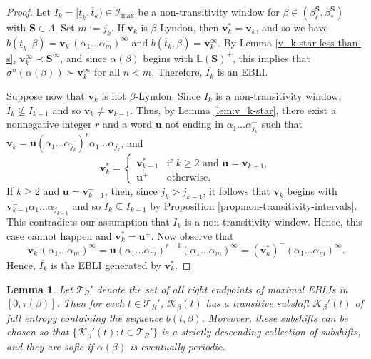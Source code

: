 \documentclass[11pt]{amsart}
\newtheorem{lemma}[theorem]{Lemma}
\theoremstyle{definition}
\theoremstyle{remark}
\numberwithin{equation}{section}
\renewcommand{\L}{\ensuremath{\mathbb{L}}}
\newcommand{\II}{\mathcal{I}}
\newcommand{\Kt}{\widetilde{\mathcal{K}}}
\newcommand{\cs}{ {\mathbf{S}}}
\renewcommand{\u}{\mathbf{u}}
\renewcommand{\v}{\mathbf{v}}
\newcommand{\f}{\infty}
\newcommand{\al}{\alpha}
\newcommand{\si}{\sigma}
\newcommand{\La}{\Lambda}
\begin{document}
\begin{proof}
Let $I_k=[\underline{t}_k,\overline{t}_k)\in\II_{\max}$ be a non-transitivity window for $\beta\in(\beta_\ell^\cs,\beta_*^\cs)$ with $\cs\in\La$. Set $m:=j_k$. If $\v_k$ is $\beta$-Lyndon, then $\v_k^*=\v_k$, and so we have $b(\underline{t}_k,\beta)=\v_k^-(\al_1\dots\al_m^-)^\f$ and $b(\overline{t}_k,\beta)=\v_k^\f$. By Lemma \ref{v_k-star-less-than-s}, $\v_k^\f\prec \cs^\f$, and since $\al(\beta)$ begins with $\L(\cs)^+$, this implies that $\si^n(\al(\beta))\succ \v_k^\f$ for all $n<m$. Therefore, $\overline{I_k}$ is an EBLI.

Suppose now that $\v_k$ is not $\beta$-Lyndon. Since $I_k$ is a non-transitivity window, $I_k\not\subseteq I_{k-1}$ and so $\v_k\neq \v_{k-1}$. Thus, by Lemma \ref{lem:v_k-star}, there exist a nonnegative integer $r$ and a word $\u$ not ending in $\al_1\dots\al_{j_k}^-$ such that $\v_k=\u(\al_1\dots\al_{j_k}^-)^r\al_1\dots\al_{j_k}$, and
\begin{equation*}
\v_k^*=\begin{cases}
\v_{k-1}^* & \mbox{if $k\geq 2$ and $\u=\v_{k-1}^-$},\\
\u^+ & \mbox{otherwise}.
\end{cases}
\end{equation*}
If $k\geq 2$ and $\u=\v_{k-1}^-$, then, since $j_k>j_{k-1}$, it follows that $\v_k$ begins with $\v_{k-1}^-\al_1\dots\al_{j_{k-1}}$ and so $I_k\subseteq I_{k-1}$ by Proposition \ref{prop:non-transitivity-intervals}. This contradicts our assumption that $I_k$ is a non-transitivity window. Hence, this case cannot happen and $\v_k^*=\u^+$. Now observe that
\[
\v_k^-(\al_1\dots\al_m^-)^\f=\u(\al_1\dots\al_m^-)^{r+1}(\al_1\dots\al_m^-)^\f=(\v_k^*)^-(\al_1\dots\al_m^-)^\f.
\]
Hence, $\overline{I_k}$ is the EBLI generated by $\v_k^*$.
\end{proof}

\begin{lemma} \label{lem:transitive-at-EBLI-right-endpoint}
Let $\mathcal{T}_R'$ denote the set of all right endpoints of {\em maximal} EBLIs in $[0,\tau(\beta)]$. Then for each $t\in\mathcal{T}_R'$, $\Kt_\beta(t)$ has a transitive subshift $\mathcal{K}_\beta'(t)$ of full entropy containing the sequence $b(t,\beta)$. Moreover, these subshifts can be chosen so that $\{\mathcal{K}_\beta'(t): t\in \mathcal{T}_R'\}$ is a strictly descending collection of subshifts, and they are sofic if $\al(\beta)$ is eventually periodic.
\end{lemma}
\end{document}
